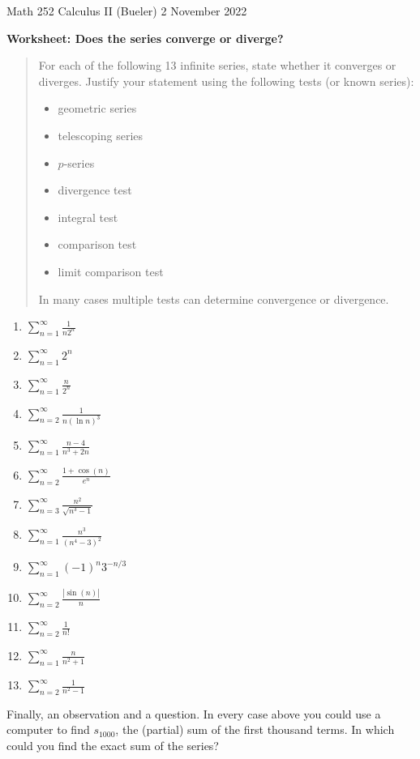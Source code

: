 \documentclass[11pt]{amsart}
\begin{document}
\scriptsize \noindent Math 252 Calculus II (Bueler) \hfill 2 November 2022 
\normalsize\medskip

\Large\centerline{\textbf{Worksheet: Does the series converge or diverge?}}
\medskip
\normalsize

\thispagestyle{empty}
\begin{quote}
For each of the following 13 infinite series, state whether it converges or diverges.  Justify your statement using the following tests (or known series):
    \begin{itemize}
    \item geometric series
    \item telescoping series
    \item $p$-series
    \item divergence test
    \item integral test
    \item comparison test
    \item limit comparison test
    \end{itemize}
In many cases multiple tests can determine convergence or divergence.
\end{quote}

\medskip
\renewcommand{\labelenumi}{\textbf{\Alph{enumi}.}}
\begin{enumerate}
\setlength\itemsep{19mm}
\item   \qquad $\displaystyle \sum_{n=1}^\infty \frac{1}{n2^n}$
\item   \qquad $\displaystyle \sum_{n=1}^\infty 2^{n}$
\item   \qquad $\displaystyle \sum_{n=1}^\infty \frac{n}{2^n}$
\item   \qquad $\displaystyle \sum_{n=2}^\infty \frac{1}{n (\ln n)^3}$
\item   \qquad $\displaystyle \sum_{n=1}^\infty \frac{n-4}{n^3+2n}$
\item   \qquad $\displaystyle \sum_{n=2}^\infty \frac{1+\cos(n)}{e^n}$
\item   \qquad $\displaystyle \sum_{n=3}^\infty \frac{n^2}{\sqrt{n^3-1}}$
\item   \qquad $\displaystyle \sum_{n=1}^\infty \frac{n^3}{(n^4-3)^2}$
\item   \qquad $\displaystyle \sum_{n=1}^\infty (-1)^n 3^{-n/3}$
\item   \qquad $\displaystyle \sum_{n=2}^\infty \frac{|\sin(n)|}{n}$
\item   \qquad $\displaystyle \sum_{n=2}^\infty \frac{1}{n!}$
\item   \qquad $\displaystyle \sum_{n=1}^\infty \frac{n}{n^2+1}$
\item   \qquad $\displaystyle \sum_{n=2}^\infty \frac{1}{n^2-1}$
\end{enumerate}

\vfill
\noindent Finally, an observation and a question.  In every case above you could use a computer to find $s_{1000}$, the (partial) sum of the first thousand terms.  In which could you find the exact sum of the series?
\vspace{0.5in}
\end{document}
